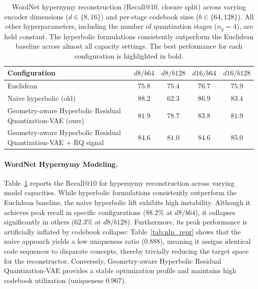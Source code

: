 \documentclass[12pt]{report}
\begin{document}
\begin{table}[h]
\centering
\caption{WordNet hypernymy reconstruction (Recall@10, closure split) across varying encoder dimensions ($d \in \{8, 16\}$) and per-stage codebook sizes ($b \in \{64, 128\}$). All other hyperparameters, including the number of quantization stages ($n_q=4$), are held constant. The hyperbolic formulations consistently outperform the Euclidean baseline across almost all capacity settings. The best performance for each configuration is highlighted in bold.}
\label{tab:nlp_grid}
\begin{tabular}{lcccc}
\hline
Configuration & $d8/b64$ & $d8/b128$ & $d16/b64$ & $d16/b128$ \\
\hline
Euclidean & $75.8$ & $75.4$ & $76.7$ & $75.9$ \\
Naive hyperbolic (old) & $\mathbf{88.2}$ & $62.3$ & $\mathbf{86.9}$ & $83.4$ \\
Geometry-aware Hyperbolic Residual Quantization-VAE (ours) & $81.9$ & $78.7$ & $83.8$ & $81.9$ \\
Geometry-aware Hyperbolic Residual Quantization-VAE + RQ signal & $84.6$ & $\mathbf{81.0}$ & $84.6$ & $\mathbf{85.0}$ \\
\hline
\end{tabular}
\end{table}

\paragraph{WordNet Hypernymy Modeling.}
Table~\ref{tab:nlp_grid} reports the Recall@10 for hypernymy reconstruction across varying model capacities. While hyperbolic formulations consistently outperform the Euclidean baseline, the naive hyperbolic lift exhibits high instability. Although it achieves peak recall in specific configurations ($88.2\%$ at $d8/b64$), it collapses significantly in others ($62.3\%$ at $d8/b128$). Furthermore, its peak performance is artificially inflated by codebook collapse: Table~\ref{tab:nlp_repr} shows that the naive approach yields a low uniqueness ratio ($0.888$), meaning it assigns identical code sequences to disparate concepts, thereby trivially reducing the target space for the reconstructor. Conversely, Geometry-aware Hyperbolic Residual Quantization-VAE provides a stable optimization profile and maintains high codebook utilization (uniqueness $0.967$). 
\end{document}
